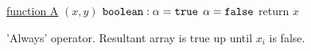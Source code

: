 \begin{algorithm}[ht]
\underline{function A} $(x, y)$\;
$\tt{boolean}: \alpha = \tt{true}$\;
$\alpha = \tt{false}$\;
 return $x$\;
\caption{'Always' operator. Resultant array is true up until $x_i$ is false.}
\label{alg:always}
\end{algorithm}
